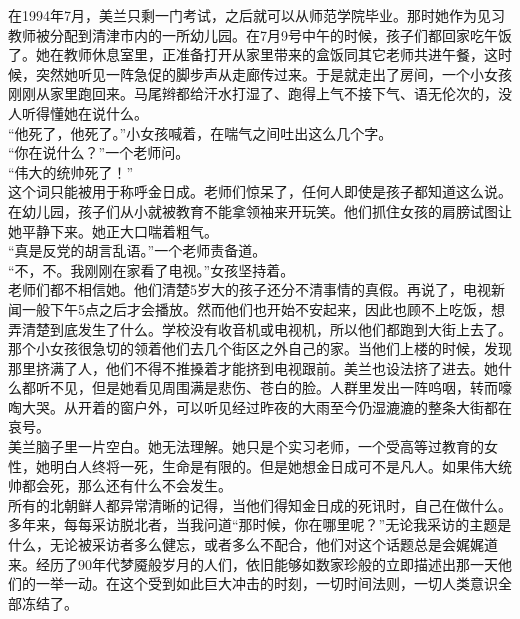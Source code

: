 \ifnum{}
	\begin{multicols}{\theparacolNo}
\fi
在1994年7月，美兰只剩一门考试，之后就可以从师范学院毕业。那时她作为见习教师被分配到清津市内的一所幼儿园。在7月9号中午的时候，孩子们都回家吃午饭了。她在教师休息室里，正准备打开从家里带来的盒饭同其它老师共进午餐，这时候，突然她听见一阵急促的脚步声从走廊传过来。于是就走出了房间，一个小女孩刚刚从家里跑回来。马尾辫都给汗水打湿了、跑得上气不接下气、语无伦次的，没人听得懂她在说什么。\\

“他死了，他死了。”小女孩喊着，在喘气之间吐出这么几个字。\\

“你在说什么？”一个老师问。\\

“伟大的统帅死了！”\\

这个词只能被用于称呼金日成。老师们惊呆了，任何人即使是孩子都知道这么说。在幼儿园，孩子们从小就被教育不能拿领袖来开玩笑。他们抓住女孩的肩膀试图让她平静下来。她正大口喘着粗气。\\

“真是反党的胡言乱语。”一个老师责备道。\\

“不，不。我刚刚在家看了电视。”女孩坚持着。\\

老师们都不相信她。他们清楚5岁大的孩子还分不清事情的真假。再说了，电视新闻一般下午5点之后才会播放。然而他们也开始不安起来，因此也顾不上吃饭，想弄清楚到底发生了什么。学校没有收音机或电视机，所以他们都跑到大街上去了。那个小女孩很急切的领着他们去几个街区之外自己的家。当他们上楼的时候，发现那里挤满了人，他们不得不推搡着才能挤到电视跟前。美兰也设法挤了进去。她什么都听不见，但是她看见周围满是悲伤、苍白的脸。人群里发出一阵呜咽，转而嚎啕大哭。从开着的窗户外，可以听见经过昨夜的大雨至今仍湿漉漉的整条大街都在哀号。\\

美兰脑子里一片空白。她无法理解。她只是个实习老师，一个受高等过教育的女性，她明白人终将一死，生命是有限的。但是她想金日成可不是凡人。如果伟大统帅都会死，那么还有什么不会发生。\\

所有的北朝鲜人都异常清晰的记得，当他们得知金日成的死讯时，自己在做什么。多年来，每每采访脱北者，当我问道“那时候，你在哪里呢？”无论我采访的主题是什么，无论被采访者多么健忘，或者多么不配合，他们对这个话题总是会娓娓道来。经历了90年代梦魇般岁月的人们，依旧能够如数家珍般的立即描述出那一天他们的一举一动。在这个受到如此巨大冲击的时刻，一切时间法则，一切人类意识全部冻结了。\\


\end{multicols}

